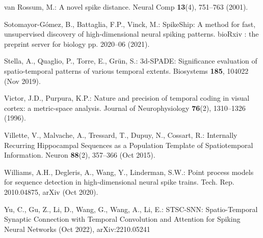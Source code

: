 \documentclass[runningheads]{llncs}
\begin{document}
\begin{thebibliography}{10}
  van Rossum, M.: A novel spike distance. Neural Comp  \textbf{13}(4),  751--763 (2001). %
  
  Sotomayor-Gómez, B., Battaglia, F.P., Vinck, M.: {SpikeShip}: {A} method for fast, unsupervised discovery of high-dimensional neural spiking patterns. bioRxiv : the preprint server for biology pp. 2020--06 (2021). %
  
  
  Stella, A., Quaglio, P., Torre, E., Grün, S.: 3d-{SPADE}: {Significance} evaluation of spatio-temporal patterns of various temporal extents. Biosystems  \textbf{185},  104022 (Nov 2019). %
  
  Victor, J.D., Purpura, K.P.: Nature and precision of temporal coding in visual cortex: a metric-space analysis. Journal of Neurophysiology  \textbf{76}(2),  1310--1326 (1996). %
  
  Villette, V., Malvache, A., Tressard, T., Dupuy, N., Cossart, R.: Internally {Recurring} {Hippocampal} {Sequences} as a {Population} {Template} of {Spatiotemporal} {Information}. Neuron  \textbf{88}(2),  357--366 (Oct 2015). %
  
  Williams, A.H., Degleris, A., Wang, Y., Linderman, S.W.: Point process models for sequence detection in high-dimensional neural spike trains. Tech. Rep. 2010.04875, arXiv (Oct 2020). %
  
  Yu, C., Gu, Z., Li, D., Wang, G., Wang, A., Li, E.: {STSC}-{SNN}: {Spatio}-{Temporal} {Synaptic} {Connection} with {Temporal} {Convolution} and {Attention} for {Spiking} {Neural} {Networks} (Oct 2022), arXiv:2210.05241 %
  
  \end{thebibliography}
  
\end{document}
